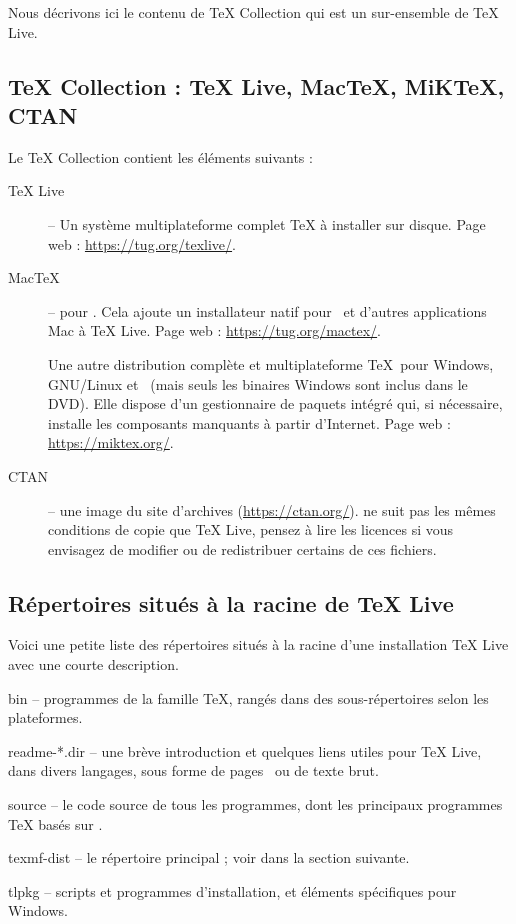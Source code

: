 \documentclass[german, english, french]{article}
\renewcommand{\TL}{\TeX{} Live\xspace}%
\renewcommand{\TK}{\TeX{} Collection\xspace}%
\begin{document}
Nous décrivons ici le contenu de \TK{} qui est un sur-ensemble de \TL.

\subsection {\protect\TK{} : \protect\TL, Mac\protect\TeX, MiK\protect\TeX,
  CTAN}
\label{sec:tl-coll-dists}

Le \DVD{} \TK{} contient les éléments suivants :

\begin{description}

\item[\TL{}] -- Un système multiplateforme complet \TeX{} à installer sur
  disque. Page web : \url{https://tug.org/texlive/}.

\item[Mac\TeX] -- pour \macOS. Cela ajoute un installateur natif pour \macOS\ et
  d'autres applications Mac à \TL{}.  Page web : \url{https://tug.org/mactex/}.

\item [\MIKTEX] Une autre distribution complète et multiplateforme \TeX\ pour
  Windows, GNU/Linux et \macOS\ (mais seuls les binaires Windows sont inclus
  dans le DVD). Elle dispose d'un gestionnaire de paquets intégré qui, si
  nécessaire, installe les composants manquants à partir d'Internet. Page
  web : \url{https://miktex.org/}.

\item[CTAN] -- une image du site d'archives \CTAN{} (\url{https://ctan.org/}).
  \CTAN{} ne suit pas les mêmes conditions de copie que \TL{}, pensez à lire les
  licences si vous envisagez de modifier ou de redistribuer certains de ces
  fichiers.

\end{description}

\subsection{Répertoires situés à la racine de \protect\TL{}}
\label{sec:tld}

Voici une petite liste des répertoires situés à la racine d'une installation \TL
avec une courte description.

\begin{ttdescription}
\item[bin] -- programmes de la famille \TeX{}, rangés dans des sous-répertoires
  selon les plateformes.
%
\item[readme-*.dir] -- une brève introduction et quelques liens utiles pour \TL,
  dans divers langages, sous forme de pages \HTML\ ou de texte brut.
%
\item[source] -- le code source de tous les programmes, dont les principaux
  programmes \TeX{} basés sur \Webc{}.
%
\item[texmf-dist] -- le répertoire principal ; voir  dans la
  section suivante.
%
\item[tlpkg] -- scripts et programmes d'installation, et éléments spécifiques
  pour Windows.
\end{ttdescription}
\end{document}
